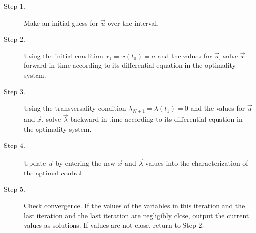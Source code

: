 \documentclass[10pt]{beamer}
\begin{document}
\begin{frame}
%	
	\begin{description}
		\item[Step 1.]
		Make an initial guess for $\vec{u}$ over the interval.
		\item[Step 2.]
		Using the initial condition $x_1 = x(t_0) = a$ and the values for 
		$\vec{u}$, solve $\vec{x}$ forward in time according to its differential
		equation in the optimality system.
		\item[Step 3.]
		Using the transversality condition $\lambda_{N+1} = \lambda(t_1) = 0$ 
		and the values for $\vec{u}$ and $\vec{x}$, solve $\vec{\lambda}$ 
		backward in time according to its differential equation in the optimality
		system.
		\item[Step 4.]
		Update $\vec{u}$ by entering the new $\vec{x}$ and $\vec{\lambda}$ values 
		into the characterization of the optimal control. 
		\item[Step 5.]
		Check convergence. If the values of the variables in this iteration and 
		the last iteration and the last iteration are negligibly close, output the 
		current values as solutions. If values are not close, return to Step 2.
	\end{description}
\end{frame}	
\end{document}
